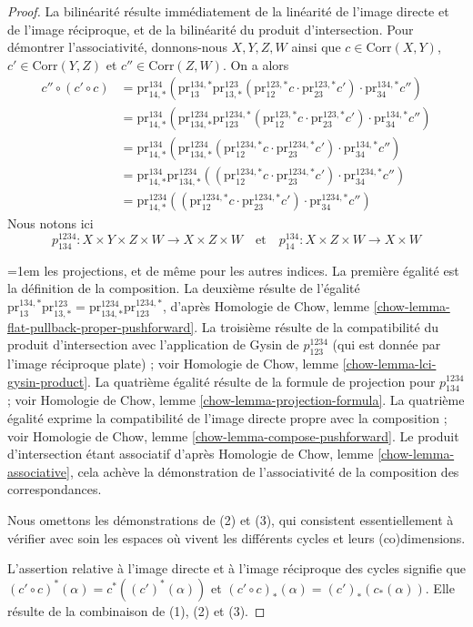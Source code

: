\begin{proof}
La bilinéarité résulte immédiatement de la linéarité de l'image directe
et de l'image réciproque, et de la bilinéarité du produit d'intersection.
Pour démontrer l'associativité, donnons-nous
$X, Y, Z, W$ ainsi que $c \in \text{Corr}(X, Y)$, $c' \in \text{Corr}(Y, Z)$ et
$c'' \in \text{Corr}(Z, W)$. On a alors
\begin{align*}
c'' \circ (c' \circ c)
& =
\text{pr}^{134}_{14, *}(
\text{pr}^{134, *}_{13}
\text{pr}^{123}_{13, *}(\text{pr}^{123, *}_{12}c \cdot
\text{pr}^{123, *}_{23}c')
\cdot \text{pr}^{134, *}_{34}c'') \\
& =
\text{pr}^{134}_{14, *}(
\text{pr}^{1234}_{134, *}
\text{pr}^{1234, *}_{123}(\text{pr}^{123, *}_{12}c \cdot
\text{pr}^{123, *}_{23}c')
\cdot \text{pr}^{134, *}_{34}c'') \\
& =
\text{pr}^{134}_{14, *}(
\text{pr}^{1234}_{134, *}
(\text{pr}^{1234, *}_{12}c \cdot
\text{pr}^{1234, *}_{23}c')
\cdot \text{pr}^{134, *}_{34}c'') \\
& =
\text{pr}^{134}_{14, *}
\text{pr}^{1234}_{134, *}
((\text{pr}^{1234, *}_{12}c \cdot
\text{pr}^{1234, *}_{23}c')
\cdot \text{pr}^{1234, *}_{34}c'') \\
& =
\text{pr}^{1234}_{14, *}(
(\text{pr}^{1234, *}_{12}c \cdot
\text{pr}^{1234, *}_{23}c') \cdot
\text{pr}^{1234, *}_{34}c'')
\end{align*}
Nous notons ici
$$
p^{1234}_{134} : X \times Y \times Z \times W \to X \times Z \times W
\quad\text{et}\quad
p^{134}_{14} : X \times Z \times W \to X \times W
$$
{\emergencystretch=1em les projections, et de même pour les autres indices.
La première égalité est la définition de la composition.
La deuxième résulte de l'égalité
$\text{pr}^{134, *}_{13} \text{pr}^{123}_{13, *} =
\text{pr}^{1234}_{134, *} \text{pr}^{1234, *}_{123}$,
d'après Homologie de Chow, lemme \ref{chow-lemma-flat-pullback-proper-pushforward}.
La troisième résulte de la compatibilité du produit d'intersection
avec l'application de Gysin de $p^{1234}_{123}$ (qui est donnée par l'image réciproque plate) ; voir
Homologie de Chow, lemme \ref{chow-lemma-lci-gysin-product}.
La quatrième égalité résulte de la formule de projection pour
$p^{1234}_{134}$ ; voir Homologie de Chow, lemme \ref{chow-lemma-projection-formula}.
La quatrième égalité exprime la compatibilité de l'image directe propre
avec la composition ; voir Homologie de Chow, lemme \ref{chow-lemma-compose-pushforward}.
Le produit d'intersection étant associatif d'après
Homologie de Chow, lemme \ref{chow-lemma-associative},
cela achève la démonstration de l'associativité de la composition des correspondances.\par}

\medskip\noindent
Nous omettons les démonstrations de (2) et (3), qui consistent essentiellement
à vérifier avec soin les espaces où vivent les différents cycles et leurs (co)dimensions.

\medskip\noindent
L'assertion relative à l'image directe et à l'image réciproque des cycles
signifie que $(c' \circ c)^*(\alpha) = c^*((c')^*(\alpha))$ et
$(c' \circ c)_*(\alpha) = (c')_*(c_*(\alpha))$.
Elle résulte de la combinaison de (1), (2) et (3).
\end{proof}

